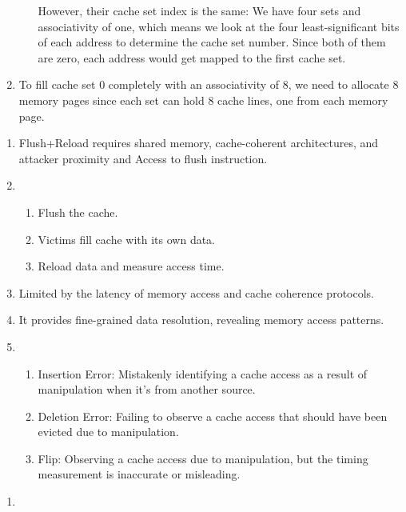 \documentclass[sheet=2, prefix, english]{dexercise}
\begin{document}
\begin{enumerate}
\begin{enumerate}
        However, their cache set index is the same:
        We have four sets and associativity of one, which means we look at the
        four least-significant bits of each address to determine the cache set
        number.
        Since both of them are zero, each address would get mapped to the first
        cache set.
    \end{enumerate}
  \item
    To fill cache set 0 completely with an associativity of 8, we need to
    allocate 8 memory pages since each set can hold 8 cache lines, one from
    each memory page.
\end{enumerate}


\begin{enumerate}
  \item
  Flush+Reload requires shared memory, cache-coherent architectures, and
    attacker proximity and Access to flush instruction.
  \item
    \begin{enumerate}
      \item Flush the cache.
      \item Victims fill cache with its own data.
      \item Reload data and measure access time.
    \end{enumerate}
  \item Limited by the latency of memory access and cache coherence protocols.
  \item It provides fine-grained data resolution, revealing memory access patterns.
  \item
    \begin{enumerate}
      \item Insertion Error: Mistakenly identifying a cache access as a result
        of manipulation when it's from another source.
      \item Deletion Error: Failing to observe a cache access that should have
        been evicted due to manipulation.
      \item Flip: Observing a cache access due to manipulation, but the timing
        measurement is inaccurate or misleading.
    \end{enumerate}

\end{enumerate}


\begin{enumerate}
  \item
\end{enumerate}
\end{document}

